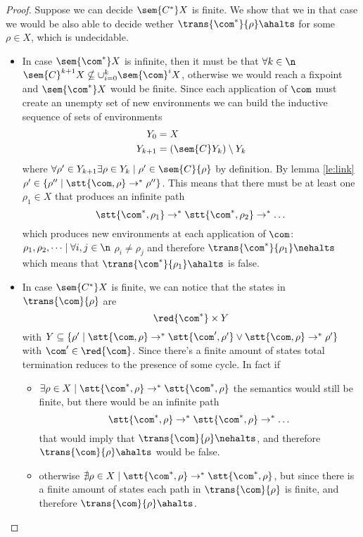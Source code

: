 \begin{proof}
  Suppose we can decide \(\sem{C^*}X\) is finite. We show that we in
  that case we would be also able to decide wether
  \(\trans{\com^*}{\rho}\ahalts\) for some \(\rho \in X\), which is
  undecidable.%
  \begin{itemize}
  \item In case \(\sem{\com^*}X\) is infinite, then it must be that
    \(\forall k \in \n\) \(\sem{C}^{k+1}X \nsubseteq
    \cup_{i=0}^k\sem{\com}^iX\), otherwise we would reach a fixpoint
    and \(\sem{\com^*}X\) would be finite. Since each application of
    \(\com\) must create an unempty set of new environments we can
    build the inductive sequence of sets of environments
    \begin{align*}
      Y_0 & = X \\
      Y_{k+1} & = (\sem{C}Y_k)\setminus Y_k
    \end{align*}
    where \(\forall \rho' \in Y_{k+1} \exists \rho \in Y_k \mid \rho'
    \in \sem{C}\{\rho\}\) by definition. By lemma \ref{le:link}
    \(\rho' \in \{\rho'' \mid \stt{\com, \rho} \to^* \rho''\}\). This
    means that there must be at least one \(\rho_1\in X\) that
    produces an infinite path \[\stt{\com^*, \rho_1}\to^*\stt{\com^*,
      \rho_2}\to^*\dots \] which produces new environments at each
    application of \(\com\): \(\rho_1, \rho_2, \dots \mid \forall i,j
    \in \n\) \(\rho_i \neq \rho_j\) and therefore
    \(\trans{\com^*}{\rho_1} \nehalts\) which means that
    \(\trans{\com^*}{\rho_1}\ahalts\) is false.
  \item In case \(\sem{C^*}X\) is finite, we can notice that the
    states in \(\trans{\com}{\rho}\) are \[\red{\com^*}\times Y\] with
    \(Y \subseteq \{\rho'\mid \stt{\com, \rho} \to^* \stt{\com',
      \rho'} \vee \stt{\com,\rho} \to^* \rho'\}\) with \(\com'\in
    \red{\com}\). Since there's a finite amount of states total
    termination reduces to the presence of some cycle. In fact if
    \begin{itemize}
    \item \(\exists \rho \in X \mid \stt{\com^*, \rho} \to^*
      \stt{\com^*, \rho}\) the semantics would still be finite, but
      there would be an infinite path \[\stt{\com^*, \rho} \to^*
      \stt{\com^*, \rho} \to^* \dots\] that would imply that
      \(\trans{\com}{\rho} \nehalts\), and therefore
      \(\trans{\com}{\rho} \ahalts\) would be false.
    \item otherwise \(\nexists \rho \in X \mid \stt{\com^*, \rho}
      \to^* \stt{\com^*, \rho}\), but since there is a finite amount
      of states each path in \(\trans{\com}{\rho}\) is finite, and
      therefore \(\trans{\com}{\rho}\ahalts\).
    \end{itemize}
  \end{itemize}
\end{proof}
